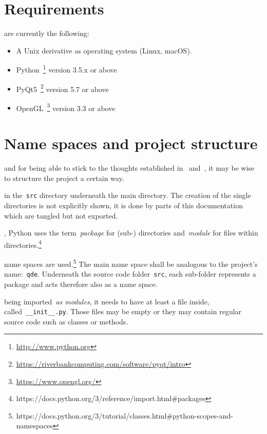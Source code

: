 \documentclass[%
    a4paper,    %
    justified,  %
    nobib,      %
    openany     %
]{tufte-book}
\begin{document}
\section{Requirements}
\label{appendix:sec:requirements}

 are currently the
following:

\begin{itemize}
  \item A Unix derivative as operating system (Linux, macOS).
  \item Python~\footnote{\url{http://www.python.org}} version 3.5.x or above
  \item PyQt5~\footnote{%
      \url{https://riverbankcomputing.com/software/pyqt/intro}} version 5.7 or
    above
  \item OpenGL~\footnote{\url{https://www.opengl.org/}} version 3.3 or above
\end{itemize}%

\section{Name spaces and project structure}
\label{appendix:sec:name-spaces}

 and for being able to
stick to the thoughts established in~
and~, it may be wise to structure the project a
certain way.

 in the~\verb+src+ directory
underneath the main directory. The creation of the single directories is not
explicitly shown, it is done by parts of this documentation which are tangled
but not exported.

, Python uses the
term~\emph{package} for (sub-) directories and~\emph{module} for files within
directories.\footnote{https://docs.python.org/3/reference/import.html\#packages}

 name
spaces are
used.\footnote{https://docs.python.org/3/tutorial/classes.html\#python-scopes-and-namespaces}
The main name space shall be analogous to the project's name:~\verb+qde+.
Underneath the source code folder~\verb+src+, each sub-folder represents a
package and acts therefore also as a name space.

 being
imported~\emph{as modules}, it needs to have at least a file inside,
called~\verb+__init__.py+. Those files may be empty or they may contain
regular source code such as classes or methods.
\end{document}
